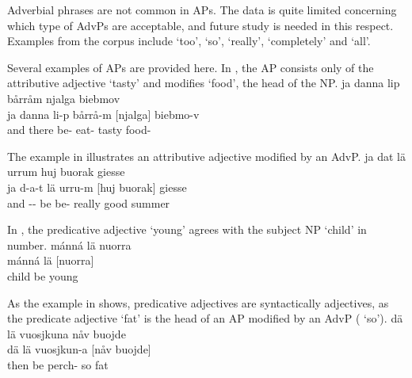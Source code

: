 Adverbial phrases are not common in APs. %
The data is quite limited concerning which type of AdvPs are acceptable, and future study is needed in this respect. Examples from the corpus include %
 ‘too’,  ‘so’,  ‘really’,  ‘completely’ and  ‘all’. 

Several examples of APs are provided here. In , the AP consists only of the attributive adjective  ‘tasty’ and modifies  ‘food’, the head of the NP. 
\ea\label{APstructureEx1}%
\glll	ja danna lip bårråm njalga biebmov\\
	ja danna li-p bårrå-m {[njalga]\subAP} biebmo-v\\
	and there be- eat- tasty food-\\\nopagebreak
{}	
\z

The example in  illustrates an attributive adjective modified by an AdvP. 
\ea\label{APstructureEx2}%
\glll	ja dat lä urrum huj buorak giesse\\
	ja d-a-t lä urru-m [huj {buorak]\subAP} giesse\\
	and -- be\BS{} be- really good summer\BS{}\\\nopagebreak
{}	
\z

In , the predicative adjective  ‘young’ agrees with the subject NP  ‘child’ in number. 
\ea\label{APstructureEx3}%
\glll	mánná lä nuorra\\
	mánná lä {[nuorra]\subAP}\\
	child\BS{} be\BS{} young\BS{}\\\nopagebreak
{}	
\z

As the example in  shows, predicative adjectives are syntactically adjectives, as the predicate adjective  ‘fat’ is the head of an AP modified by an AdvP ( ‘so’). %
\ea\label{APstructureEx4}%
\glll	dä lä vuosjkuna nåv buojde\\
	dä lä vuosjkun-a [nåv {buojde]\subAP}\\
	then be\BS{} perch- so fat\BS{}\\\nopagebreak
{}	
\z


